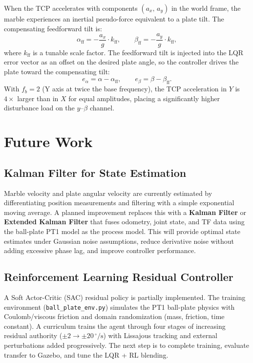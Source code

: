 \documentclass[journal]{IEEEtran}
\begin{document}
When the TCP accelerates with components $(a_x,\,a_y)$ in the world frame, the marble experiences an
inertial pseudo-force equivalent to a plate tilt. The compensating feedforward tilt is:
%
\begin{equation}
  \alpha_\mathrm{ff} = -\frac{a_x}{g}\cdot k_\mathrm{ff}, \qquad
  \beta_\mathrm{ff}  = -\frac{a_y}{g}\cdot k_\mathrm{ff},
  \label{eq:ff_tilt}
\end{equation}
%
where $k_\mathrm{ff}$ is a tunable scale factor. The feedforward tilt is injected into the LQR error
vector as an offset on the desired plate angle, so the controller drives the plate toward the compensating
tilt:
%
\begin{equation}
  e_\alpha = \alpha - \alpha_\mathrm{ff}, \qquad e_\beta = \beta - \beta_\mathrm{ff}.
\end{equation}
%
With $f_b = 2$ (Y axis at twice the base frequency), the TCP acceleration in $Y$ is $4\times$ larger than
in $X$ for equal amplitudes, placing a significantly higher disturbance load on the $y$--$\beta$ channel.

\section{Future Work}

\subsection{Kalman Filter for State Estimation}
Marble velocity and plate angular velocity are currently estimated by differentiating position measurements
and filtering with a simple exponential moving average. A planned improvement replaces this with a
\textbf{Kalman Filter} or \textbf{Extended Kalman Filter} that fuses odometry, joint state, and TF data
using the ball-plate PT1 model as the process model. This will provide optimal state estimates under
Gaussian noise assumptions, reduce derivative noise without adding excessive phase lag, and improve
controller performance.

\subsection{Reinforcement Learning Residual Controller}
A Soft Actor-Critic (SAC) residual policy is partially implemented. The training environment
(\texttt{ball\_plate\_env.py}) simulates the PT1 ball-plate physics with Coulomb/viscous friction and
domain randomization (mass, friction, time constant). A curriculum trains the agent through four stages
of increasing residual authority ($\pm 2 \to \pm 20\,^\circ/\mathrm{s}$) with Lissajous tracking and
external perturbations added progressively. The next step is to complete training, evaluate transfer to
Gazebo, and tune the LQR + RL blending.
\end{document}
